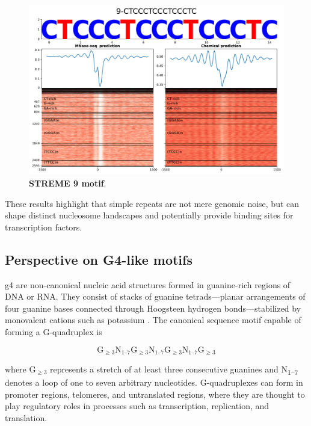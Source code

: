 \documentclass[11pt]{book}
\begin{document}
\begin{figure}[htbp]
    \centering
    \includegraphics[width=\textwidth]{Figures/Results/xstreme_onrep_meta_hm/9-CTCCCTCCCTCCCTC.pdf}
    \caption{\textbf{STREME 9 motif}. }
    \label{fig:streme9}
\end{figure}

These results highlight that simple repeats are not mere genomic noise, but can shape distinct nucleosome landscapes and potentially provide binding sites for transcription factors.

\FloatBarrier
\subsection{Perspective on G4-like motifs}
\gls{g4} are non-canonical nucleic acid structures formed in guanine-rich regions of DNA or RNA. They consist of stacks of guanine tetrads---planar arrangements of four guanine bases connected through Hoogsteen hydrogen bonds---stabilized by monovalent cations such as potassium \cite{hoogsteen_crystal_1963}. The canonical sequence motif capable of forming a G-quadruplex is 

\[
\text{G}_{\geq 3}\text{N}_{1\text{--}7}\text{G}_{\geq 3}\text{N}_{1\text{--}7}\text{G}_{\geq 3}\text{N}_{1\text{--}7}\text{G}_{\geq 3}
\]

where $\text{G}_{\geq 3}$ represents a stretch of at least three consecutive guanines and N\textsubscript{1--7} denotes a loop of one to seven arbitrary nucleotides. G-quadruplexes can form in promoter regions, telomeres, and untranslated regions, where they are thought to play regulatory roles in processes such as transcription, replication, and translation.
\end{document}
